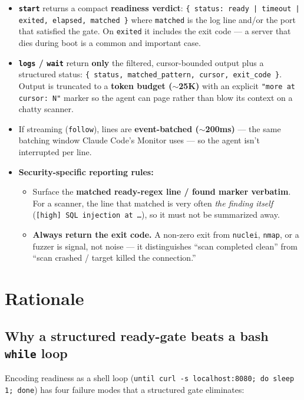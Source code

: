 \documentclass[11pt]{article}
\begin{document}
\begin{itemize}[leftmargin=*]
  \item \textbf{\texttt{start}} returns a compact \textbf{readiness verdict}:
  \texttt{\{ status: ready | timeout | exited, elapsed, matched \}} where
  \texttt{matched} is the log line and/or the port that satisfied the gate. On
  \texttt{exited} it includes the exit code --- a server that dies during boot is
  a common and important case.
  \item \textbf{\texttt{logs} / \texttt{wait}} return \textbf{only} the filtered,
  cursor-bounded output plus a structured status:
  \texttt{\{ status, matched\_pattern, cursor, exit\_code \}}. Output is truncated
  to a \textbf{token budget ($\sim$25K)} with an explicit
  \texttt{"more at cursor: N"} marker so the agent can page rather than blow its
  context on a chatty scanner.
  \item If streaming (\texttt{follow}), lines are \textbf{event-batched
  ($\sim$200ms)} --- the same batching window Claude Code's Monitor uses --- so
  the agent isn't interrupted per line.
  \item \textbf{Security-specific reporting rules:}
  \begin{itemize}[leftmargin=*]
    \item Surface the \textbf{matched ready-regex line / found marker verbatim}.
    For a scanner, the line that matched is very often \textit{the finding itself}
    (\texttt{[high] SQL injection at \ldots}), so it must not be summarized away.
    \item \textbf{Always return the exit code.} A non-zero exit from
    \texttt{nuclei}, \texttt{nmap}, or a fuzzer is signal, not noise --- it
    distinguishes ``scan completed clean'' from ``scan crashed / target killed the
    connection.''
  \end{itemize}
\end{itemize}

\section{Rationale}

\subsection{Why a structured ready-gate beats a bash \texttt{while} loop}

Encoding readiness as a shell loop
(\texttt{until curl -s localhost:8080; do sleep 1; done}) has four failure modes
that a structured gate eliminates:
\end{document}
